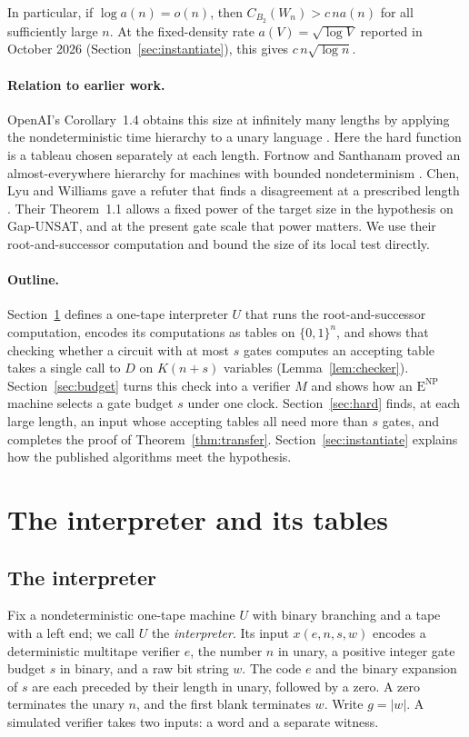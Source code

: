 \documentclass[12pt,letterpaper]{article}
\newcommand{\ENP}{\mathrm{E}^{\mathrm{NP}}}
\newcommand{\size}{C_{B_2}}
\newcommand{\bits}{\{0,1\}}
\begin{document}
In particular, if \(\log a(n)=o(n)\), then \(\size(W_n)>c\,n a(n)\) for all
sufficiently large \(n\). At the fixed-density rate
\(a(V)=\sqrt{\log V}\) reported in October 2026
(Section~\ref{sec:instantiate}), this gives \(c\,n\sqrt{\log n}\).

\paragraph{Relation to earlier work.}
OpenAI's Corollary~1.4 obtains this size at infinitely many lengths by
applying the nondeterministic time hierarchy to a unary language
\cite{oai}. Here the hard function is a tableau chosen separately at each
length. Fortnow and Santhanam proved an almost-everywhere hierarchy for
machines with bounded nondeterminism \cite{fs}. Chen, Lyu and Williams gave
a refuter that finds a disagreement at a prescribed length
\cite[Secs.~4--5]{clw}. Their Theorem~1.1 allows a fixed power of the target
size in the hypothesis on Gap-UNSAT, and at the present gate scale that
power matters. We use their root-and-successor computation and bound the
size of its local test directly.

\paragraph{Outline.}
Section~\ref{sec:interpreter} defines a one-tape interpreter \(U\) that runs
the root-and-successor computation, encodes its computations as tables on
\(\bits^n\), and shows that checking whether a circuit with at most \(s\)
gates computes an accepting table takes a single call to \(D\) on
\(K(n+s)\) variables (Lemma~\ref{lem:checker}). Section~\ref{sec:budget}
turns this check into a verifier \(M\) and shows how an \(\ENP\) machine
selects a gate budget \(s\) under one clock. Section~\ref{sec:hard} finds,
at each large length, an input whose accepting tables all need more than
\(s\) gates, and completes the proof of Theorem~\ref{thm:transfer}.
Section~\ref{sec:instantiate} explains how the published algorithms meet
the hypothesis.

\section{The interpreter and its tables}\label{sec:interpreter}

\subsection{The interpreter}
Fix a nondeterministic one-tape machine \(U\) with binary branching and a
tape with a left end; we call \(U\) the \emph{interpreter}. Its input
\(x(e,n,s,w)\) encodes a deterministic multitape verifier \(e\), the number
\(n\) in unary, a positive integer gate budget \(s\) in binary, and a raw
bit string \(w\). The code \(e\) and the binary expansion of \(s\) are each
preceded by their length in unary, followed by a zero. A zero terminates
the unary \(n\), and the first blank terminates \(w\). Write \(g=|w|\). A
simulated verifier takes two inputs: a word and a separate witness.
\end{document}
